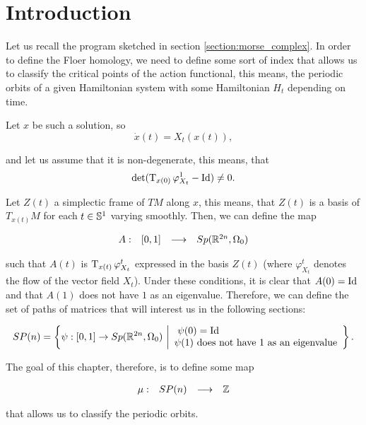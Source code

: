 \section{Introduction}

Let us recall the program sketched in section \ref{section:morse_complex}. In order to define the Floer homology, we need to define some sort of index that allows us to classify the critical points of the action functional, this means, the periodic orbits of a given Hamiltonian system with some Hamiltonian $H_t$ depending on time.

Let $x$ be such a solution, so
\[\dot{x}(t) = X_t(x(t)) ,\]

and let us assume that it is non-degenerate, this means, that
\[\text{det}(\operatorname T_{x(0)} \varphi_{X_t}^1 - \text{Id}) \neq 0 .\]

Let $Z(t)$ a simplectic frame of $TM$ along $x$, this means, that $Z(t)$ is a basis of $T_{x(t)}M$ for each $t \in \mathbb{S}^1$ varying smoothly. Then, we can define the map

\[\begin{array}{rccc} A : & [0,1] & \longrightarrow & Sp(\mathbb{R}^{2n},\Omega_0) \end{array}\]

such that $A(t)$ is $\operatorname T_{x(t)} \varphi_{X_t}^t$ expressed in the basis $Z(t)$ (where $\varphi_{X_t}^t$ denotes the flow of the vector field $X_t$). Under these conditions, it is clear that $A(0) = \text{Id}$ and that $A(1)$ does not have $1$ as an eigenvalue. Therefore, we can define the set of paths of matrices that will interest us in the following sections:

\[SP(n) = \left\{ \psi : [0,1] \rightarrow Sp(\mathbb{R}^{2n},\Omega_0) \ \bigg| \begin{array}{l} \ \psi(0) = \text{Id} \\ \psi(1) \text{ does not have 1 as an eigenvalue} \end{array} \right\} .\]

The goal of this chapter, therefore, is to define some map

\[\begin{array}{rccc} \mu : & SP(n) & \longrightarrow & \mathbb{Z} \end{array}\]

that allows us to classify the periodic orbits.
